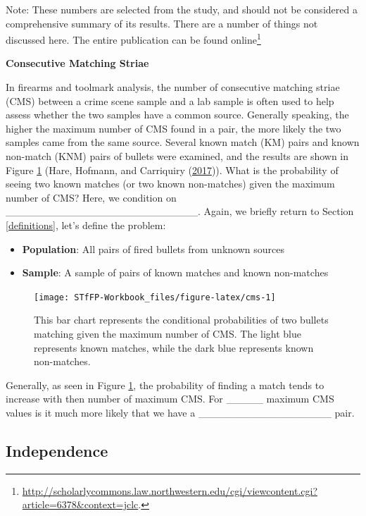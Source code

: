 \documentclass[]{book}
\providecommand{\tightlist}{%
  \setlength{\itemsep}{0pt}\setlength{\parskip}{0pt}}
\let\rmarkdownfootnote\footnote%
\def\footnote{\protect\rmarkdownfootnote}
\theoremstyle{definition}
\theoremstyle{definition}
\theoremstyle{remark}
\begin{document}
Note: These numbers are selected from the study, and should not be
considered a comprehensive summary of its results. There are a number of
things not discussed here. The entire publication can be found
online\footnote{\url{http://scholarlycommons.law.northwestern.edu/cgi/viewcontent.cgi?article=6378\&context=jclc}.}

\textbf{Consecutive Matching Striae}

In firearms and toolmark analysis, the number of consecutive matching
striae (CMS) between a crime scene sample and a lab sample is often used
to help assess whether the two samples have a common source. Generally
speaking, the higher the maximum number of CMS found in a pair, the more
likely the two samples came from the same source. Several known match
(KM) pairs and known non-match (KNM) pairs of bullets were examined, and
the results are shown in Figure \ref{fig:cms} (Hare, Hofmann, and
Carriquiry (\protect\hyperlink{ref-hare}{2017})). What is the
probability of seeing two known matches (or two known non-matches) given
the maximum number of CMS? Here, we condition on
\_\_\_\_\_\_\_\_\_\_\_\_\_\_\_\_\_\_\_\_\_\_\_\_\_\_. Again, we briefly
return to Section \ref{definitions}, let's define the problem:

\begin{itemize}
\tightlist
\item
  \textbf{Population}: All pairs of fired bullets from unknown sources
\item
  \textbf{Sample}: A sample of pairs of known matches and known
  non-matches
\end{itemize}

\begin{figure}[h]

{\centering \texttt{[image: STfFP-Workbook\_files/figure-latex/cms-1]} 

}

\caption{This bar chart represents the conditional probabilities of two bullets matching given the maximum number of CMS. The light blue represents known matches, while the dark blue represents known non-matches.}\label{fig:cms}
\end{figure}

Generally, as seen in Figure \ref{fig:cms}, the probability of finding a
match tends to increase with then number of maximum CMS. For \_\_\_\_\_
maximum CMS values is it much more likely that we have a
\_\_\_\_\_\_\_\_\_\_\_\_\_\_\_\_\_\_ pair.

\subsection{Independence}\label{independence}
\end{document}
